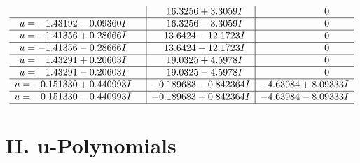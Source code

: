 \documentclass[1p]{elsarticle_modified}
\theoremstyle{definition}
\begin{document}
$$\begin{array}{c|c|c}
 & \phantom{-}16.3256 + 3.3059 I & \phantom{-0.000000 } 0 \\ \hline\begin{aligned}
u &= -1.43192 - 0.09360 I\end{aligned}
 & \phantom{-}16.3256 - 3.3059 I & \phantom{-0.000000 } 0 \\ \hline\begin{aligned}
u &= -1.41356 + 0.28666 I\end{aligned}
 & \phantom{-}13.6424 - 12.1723 I & \phantom{-0.000000 } 0 \\ \hline\begin{aligned}
u &= -1.41356 - 0.28666 I\end{aligned}
 & \phantom{-}13.6424 + 12.1723 I & \phantom{-0.000000 } 0 \\ \hline\begin{aligned}
u &= \phantom{-}1.43291 + 0.20603 I\end{aligned}
 & \phantom{-}19.0325 + 4.5978 I & \phantom{-0.000000 } 0 \\ \hline\begin{aligned}
u &= \phantom{-}1.43291 - 0.20603 I\end{aligned}
 & \phantom{-}19.0325 - 4.5978 I & \phantom{-0.000000 } 0 \\ \hline\begin{aligned}
u &= -0.151330 + 0.440993 I\end{aligned}
 & -0.189683 - 0.842364 I & -4.63984 + 8.09333 I \\ \hline\begin{aligned}
u &= -0.151330 - 0.440993 I\end{aligned}
 & -0.189683 + 0.842364 I & -4.63984 - 8.09333 I\\
 \hline 
 \end{array}$$\newpage
\newpage\renewcommand{\arraystretch}{1}
\centering \section*{ II. u-Polynomials}
\end{document}
